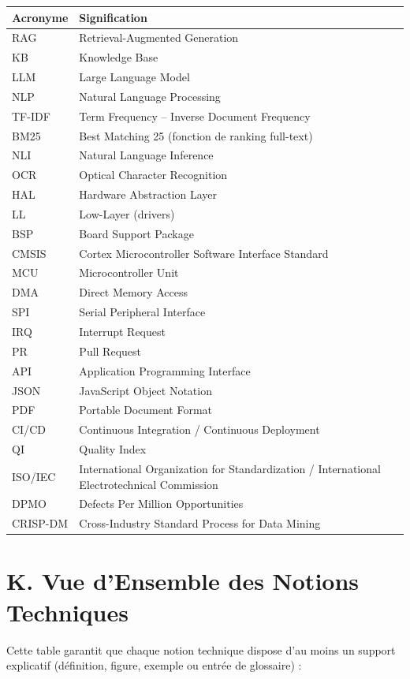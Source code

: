 \documentclass[12pt,a4paper]{report}
\begin{document}
\begin{longtable}{p{3cm}p{10.5cm}}
\toprule
\textbf{Acronyme} & \textbf{Signification} \\
\midrule
RAG & Retrieval-Augmented Generation \\
KB & Knowledge Base \\
LLM & Large Language Model \\
NLP & Natural Language Processing \\
TF-IDF & Term Frequency -- Inverse Document Frequency \\
BM25 & Best Matching 25 (fonction de ranking full-text) \\
NLI & Natural Language Inference \\
OCR & Optical Character Recognition \\
HAL & Hardware Abstraction Layer \\
LL & Low-Layer (drivers) \\
BSP & Board Support Package \\
CMSIS & Cortex Microcontroller Software Interface Standard \\
MCU & Microcontroller Unit \\
DMA & Direct Memory Access \\
SPI & Serial Peripheral Interface \\
IRQ & Interrupt Request \\
PR & Pull Request \\
API & Application Programming Interface \\
JSON & JavaScript Object Notation \\
PDF & Portable Document Format \\
CI/CD & Continuous Integration / Continuous Deployment \\
QI & Quality Index \\
ISO/IEC & International Organization for Standardization / International Electrotechnical Commission \\
DPMO & Defects Per Million Opportunities \\
CRISP-DM & Cross-Industry Standard Process for Data Mining \\
\bottomrule
\end{longtable}

\section*{K. Vue d'Ensemble des Notions Techniques}

Cette table garantit que chaque notion technique dispose d'au moins un support explicatif (définition, figure, exemple ou entrée de glossaire) :
\end{document}
